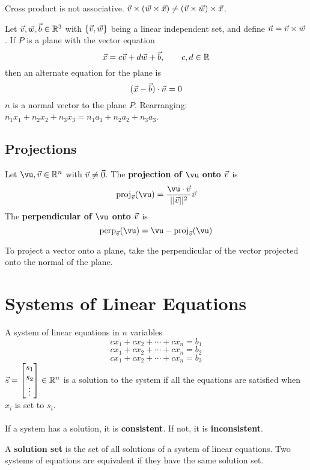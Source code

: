 \documentclass[english, 12pt]{article}
\begin{document}
\begin{qte}
Cross product is not associative. $\vec{v} \times (\vec{w} \times \vec{x}) \neq (\vec{v} \times \vec{w}) \times \vec{x}$.
\end{qte}

\begin{thrm}
Let $\vec{v},\vec{w}, \vec{b} \in {\mathbb{R}}^3$ with $\{\vec{v},\vec{w}\}$ being a linear independent set, and define $\vec{n} = \vec{v} \times \vec{w}$. If $P$ is a plane with the vector equation
\[ \vec{x} = c \vec{v} + d \vec{w} + \vec{b}, \qquad c,d \in {\mathbb{R}}\]
then an alternate equation for the plane is 
\[(\vec{x} - \vec{b}) \cdot \vec{n} = 0\]
$n$ is a normal vector to the plane $P$.
Rearranging: $n_{1} x_{1} + n_{2} x_{2} + n_{3} x_{3} = n_{1} a_{1} + n_{2} a_{2} + n_{3} a_{3}$.
\end{thrm}

\subsection{Projections}
\begin{defn}
Let $\vu,\vv \in \R^n$ with $\vec{v} \neq \vec{0}$. The \textbf{projection of $\vu$ onto $\vec{v}$} is
\[\operatorname{proj}_{\vv} (\vu) = \f{\vu \cdot \vv}{||\vv||^2} \vv\]
The \textbf{perpendicular of $\vu$ onto $\vec{v}$} is
\[\operatorname{perp}_{\vv}(\vu) = \vu - \operatorname{proj}_{\vv}(\vu)\]
\end{defn}
\begin{qte}
To project a vector onto a plane, take the perpendicular of the vector projected onto the normal of the plane.
\end{qte}

\section{Systems of Linear Equations}

\begin{defn}
A system of linear equations in $n$ variables
\begin{equation}
c x_{1} + c x_{2} + \cdots + c x_{n} = b_{1}
\end{equation}
\begin{equation}
c x_{1} + c x_{2} + \cdots + c x_{n} = b_{2}
\end{equation}
\begin{equation}
c x_{1} + c x_{2} +\cdots + c x_{n} = b_{3}
\end{equation}
$\vec{s} = \begin{bmatrix} s_{1} \\ s_{2} \\ \vdots \end{bmatrix} \in {\mathbb{R}}^n$ is a solution to the system if all the equations are satisfied when $x_{i}$ is set to $s_{i}$.\\\\
If a system has a solution, it is \textbf{consistent}. If not, it is \textbf{inconsistent}.
\end{defn}
\begin{defn}
A \textbf{solution set} is the set of all solutions of a system of linear equations. Two systems of equations are equivalent if they have the same solution set.
\end{defn}
\end{document}
